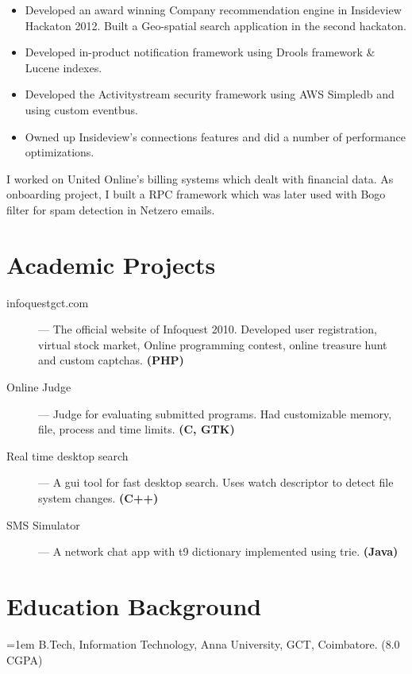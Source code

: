 \documentclass{resume}
\begin{document}
\begin{itemize} \itemsep1pt \parskip0pt
  \item Developed an award winning Company recommendation engine in Insideview Hackaton 2012.  Built a Geo-spatial search application in the second hackaton.
  \item Developed in-product notification framework using Drools framework \& Lucene indexes.
  \item Developed the Activitystream security framework using AWS Simpledb and using custom eventbus.
  \item Owned up Insideview's connections features and did a number of performance optimizations.
\end{itemize}
I worked on United Online's billing systems which dealt with financial data.  As onboarding project, I built a RPC framework which was later used with Bogo filter for spam detection in Netzero emails.
 
\section{Academic Projects}
\begin{description}
  \item[infoquestgct.com] --- The official website of Infoquest 2010. Developed user registration, virtual stock market, Online programming contest, online treasure hunt and custom captchas. \textbf{(PHP)}
  \item[Online Judge] --- Judge for evaluating submitted programs.  Had customizable memory, file, process and time limits. \textbf{(C, GTK)}
  \item[Real time desktop search] --- A gui tool for fast desktop search.  Uses watch descriptor to detect file system changes. \textbf{(C++)}
  \item[SMS Simulator] --- A network chat app with t9 dictionary implemented using trie.  \textbf{(Java)}
\end{description}

\section{Education Background}
\noindent \hangindent=1em  B.Tech, Information Technology, Anna University, GCT, Coimbatore. (8.0 CGPA)
\end{document}
